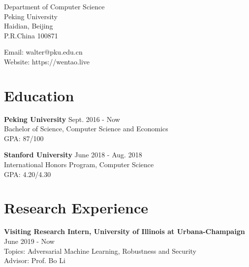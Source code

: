 \documentclass{academiccv}
\begin{document}
\raggedright


\vspace{1em}
\begin{minipage}[t]{0.495\textwidth}
  Department of Computer Science \\
 Peking University\\
  Haidian, Beijing\\
  P.R.China 100871
\end{minipage}
\begin{minipage}[t]{0.495\textwidth}
  Email: walter@pku.edu.cn \\
  Website: https://wentao.live \\
\end{minipage}
\vspace{0.5em}


\section*{Education}



\textbf{Peking University} \hfill Sept. 2016 - Now  \\
Bachelor of Science, Computer Science and Economics \\
GPA: 87/100 \newline

\textbf{Stanford University} \hfill June 2018 - Aug. 2018 \\
International Honors Program, Computer Science \\
GPA: 4.20/4.30 \\

\section*{Research Experience}

\textbf{Visiting Research Intern, University of Illinois at Urbana-Champaign} \hfill June 2019 - Now  \\
Topics: Adversarial Machine Learning, Robustness and Security \\
Advisor: Prof. Bo Li \newline
\end{document}
